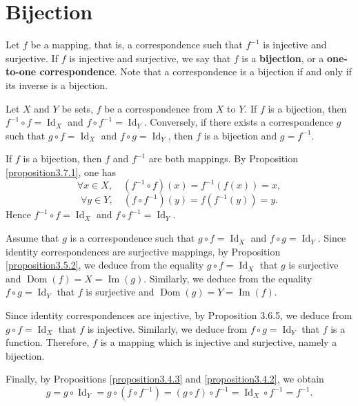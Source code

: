 \section{Bijection}

\begin{definitionenv}
    Let \( f \) be a mapping,  that is,  a correspondence such that \( f^{-1} \) is injective and surjective. If \( f \) is injective and surjective,  we say that \( f \) is a \textbf{bijection},  or a \textbf{one-to-one correspondence}. Note that a correspondence is a bijection if and only if its inverse is a bijection.

\end{definitionenv}

\begin{propositionenv}\label{proposition3.8.1}
    Let \( X \) and \( Y \) be sets,  \( f \) be a correspondence from \( X \) to \( Y \). If \( f \) is a bijection,  then \( f^{-1} \circ f = \operatorname{Id}_X \) and \( f \circ f^{-1} = \operatorname{Id}_Y \). Conversely,  if there exists a correspondence \( g \) such that \( g \circ f = \operatorname{Id}_X \) and \( f \circ g = \operatorname{Id}_Y \),  then \( f \) is a bijection and \( g = f^{-1} \).

\end{propositionenv}

\begin{proofenv}
    If \( f \) is a bijection,  then \( f \) and \( f^{-1} \) are both mappings. By Proposition \ref{proposition3.7.1},  one has
\[
\forall x \in X,  \quad (f^{-1} \circ f)(x) = f^{-1}(f(x)) = x, 
\]
\[
\forall y \in Y,  \quad (f \circ f^{-1})(y) = f(f^{-1}(y)) = y.
\]
Hence \( f^{-1} \circ f = \operatorname{Id}_X \) and \( f \circ f^{-1} = \operatorname{Id}_Y \).

Assume that \( g \) is a correspondence such that \( g \circ f = \operatorname{Id}_X \) and \( f \circ g = \operatorname{Id}_Y \). Since identity correspondences are surjective mappings,  by Proposition \ref{proposition3.5.2},  we deduce from the equality \( g \circ f = \operatorname{Id}_X \) that \( g \) is surjective and \( \operatorname{Dom}(f) = X = \operatorname{Im}(g) \). Similarly,  we deduce from the equality \( f \circ g = \operatorname{Id}_Y \) that \( f \) is surjective and \( \operatorname{Dom}(g) = Y = \operatorname{Im}(f) \).

Since identity correspondences are injective,  by Proposition 3.6.5,  we deduce from \( g \circ f = \operatorname{Id}_X \) that \( f \) is injective. Similarly,  we deduce from \( f \circ g = \operatorname{Id}_Y \) that \( f \) is a function. Therefore,  \( f \) is a mapping which is injective and surjective,  namely a bijection.

Finally,  by Propositions \ref{proposition3.4.3} and \ref{proposition3.4.2},  we obtain
\[
g = g \circ \operatorname{Id}_Y = g \circ (f \circ f^{-1}) = (g \circ f) \circ f^{-1} = \operatorname{Id}_X \circ f^{-1} = f^{-1}.
\]
\end{proofenv}



